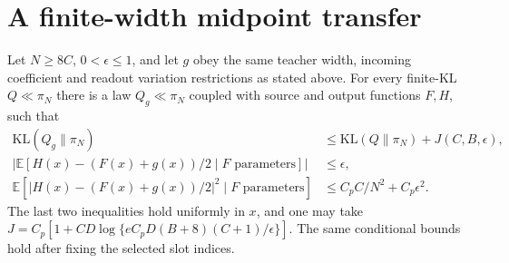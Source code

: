 \section{A finite-width midpoint transfer}
\begin{lemma}
\label{lem:merge-transfer}
Let $N\ge8C$, $0<\epsilon\le1$, and let $g$ obey the same teacher
width, incoming coefficient and readout variation restrictions as stated above.
For every finite-KL $Q\ll\pi_N$ there is a law
$Q_g\ll\pi_N$ coupled with source and output functions $F,H$, such that
\begin{align}
 \mathrm{KL}(Q_g\|\pi_N)
 &\le\mathrm{KL}(Q\|\pi_N)+J(C,B,\epsilon),
 \label{eq:merge-KL}\\
 \left|\mathbb E[H(x)-(F(x)+g(x))/2\mid F\text{ parameters}]\right|
 &\le\epsilon,
 \label{eq:merge-mean}\\
 \mathbb E[|H(x)-(F(x)+g(x))/2|^2\mid F\text{ parameters}]
 &\le C_p C/N^2+C_p\epsilon^2.
 \label{eq:merge-second}
\end{align}
The last two inequalities hold uniformly in $x$, and one may take
$J=C_p[1+CD\log\{eC_pD(B+8)(C+1)/\epsilon\}]$.
The same conditional bounds hold after fixing the selected slot indices.
\end{lemma}
